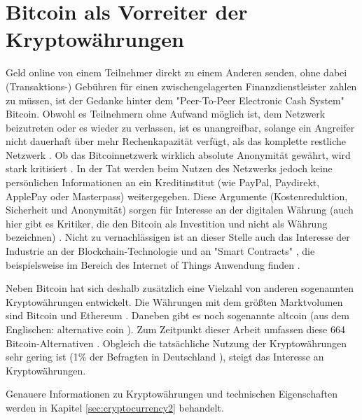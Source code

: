 \section{Bitcoin als Vorreiter der Kryptowährungen}\label{sec:cryptocurrency}
Geld online von einem Teilnehmer direkt zu einem Anderen senden, ohne dabei (Transaktions-) Gebühren für einen zwischengelagerten Finanzdienstleister zahlen zu müssen, ist der Gedanke hinter dem "Peer-To-Peer Electronic Cash System" \citep{nakamoto_bitcoin:_2008} Bitcoin. Obwohl es Teilnehmern ohne Aufwand möglich ist, dem Netzwerk beizutreten oder es wieder zu verlassen, ist es unangreifbar, solange ein Angreifer nicht dauerhaft über mehr Rechenkapazität verfügt, als das komplette restliche Netzwerk \citep{nakamoto_bitcoin:_2008}. Ob das Bitcoinnetzwerk wirklich absolute Anonymität gewährt, wird stark kritisiert \citep{reid_analysis_2013,androulaki_evaluating_2013}. In der Tat werden beim Nutzen des Netzwerks jedoch keine persönlichen Informationen an ein Kreditinstitut (wie PayPal, Paydirekt, ApplePay oder Masterpass) weitergegeben. Diese Argumente (Kostenreduktion, Sicherheit und Anonymität) sorgen für Interesse an der digitalen Währung (auch hier gibt es Kritiker, die den Bitcoin als Investition und nicht als Währung bezeichnen) \citep{baur_bitcoin:_2015}. Nicht zu vernachlässigen ist an dieser Stelle auch das Interesse der Industrie an der Blockchain-Technologie und an "Smart Contracts" \citep[S.~10]{dannen_introducing_2017}, die beispielsweise im Bereich des Internet of Things Anwendung finden \citep{christidis_blockchains_2016}.\par
Neben Bitcoin hat sich deshalb zusätzlich eine Vielzahl von anderen sogenannten Kryptowährungen entwickelt. Die Währungen mit dem größten Marktvolumen sind  Bitcoin und Ethereum \citep{wood_ethereum:_2014} \citep{brandt_infografik:_2017, coinmarketcap_ranking_2017}. Daneben gibt es noch sogenannte \gls{altcoin} (aus dem Englischen: alternative coin \citep{prableen_bajpai_altcoin_2014}). Zum Zeitpunkt dieser Arbeit umfassen diese 664 Bitcoin-Alternativen \citep{coindesk_anzahl_2017}. Obgleich die tatsächliche Nutzung der Kryptowährungen sehr gering ist (1\% der Befragten in Deutschland \citep{tsys_kennen_2016}), steigt das Interesse an Kryptowährungen\citep{wikitrends_compare_2017,googletrends_googletrends_2017}.\par
Genauere Informationen zu Kryptowährungen und technischen Eigenschaften werden in Kapitel \ref{sec:cryptocurrency2} behandelt.

